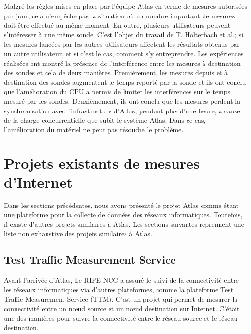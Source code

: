 Malgré les règles mises en place par l'équipe Atlas en terme de mesures autorisées par jour, cela n'empêche pas la situation où 
 un nombre important de mesures  doit être effectué au même moment. En outre, plusieurs  utilisateurs peuvent s'intéresser à une même sonde. C'est l'objet du  travail \cite{Holterbach:2015:QIM:2815675.2815710} de T. Holterbach et al.; si les mesures lancées par les autres utilisateurs affectent les résultats obtenus par un autre utilisateur, et si c'est le cas, comment s'y entreprendre. Les expériences réalisées ont montré la présence de l'interférence entre les mesures à destination des sondes et cela de deux manières. Premièrement, les mesures depuis et à destination des sondes augmentent le temps reporté par la sonde et ils ont conclu que l'amélioration du CPU a permis de limiter les interférences sur le temps mesuré par les sondes. Deuxièmement,  ils ont conclu que les mesures perdent la synchronisation avec l'infrastructure d'Atlas, pendant plus d'une heure, à cause de la charge concurrentielle que subit le système Atlas. Dans ce cas, l'amélioration du matériel ne peut pas résoudre le problème.



\section{Projets existants de mesures d'Internet}

Dans les sections précédentes, nous avons présenté  le projet  Atlas comme étant une plateforme pour la collecte de données des réseaux informatiques.  Toutefois, il existe d'autres projets similaires à  Atlas. Les sections suivantes reprennent une liste non exhaustive des projets similaires  à  Atlas.

\subsection{Test Traffic Measurement Service}

Avant l'arrivée d'Atlas, Le RIPE NCC a assuré le suivi de la connectivité entre les réseaux informatiques via  d'autres plateformes, comme la plateforme Test Traffic Measurement Service (TTM). C'est un projet qui permet de mesurer la connectivité entre un n\oe{}ud  source  et  un n\oe{}ud destination sur Internet.  C'était une des manières  pour  suivre la connectivité entre le réseau source et le réseau destination. 

